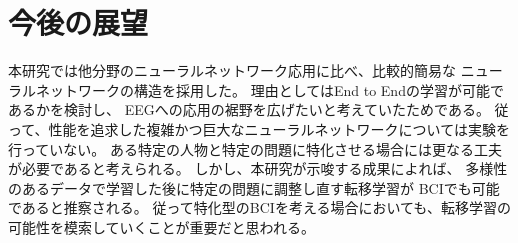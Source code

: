 \section{\mc 今後の展望}
本研究では他分野のニューラルネットワーク応用に比べ、比較的簡易な
ニューラルネットワークの構造を採用した。
理由としてはEnd to Endの学習が可能であるかを検討し、
EEGへの応用の裾野を広げたいと考えていたためである。
従って、性能を追求した複雑かつ巨大なニューラルネットワークについては実験を行っていない。
ある特定の人物と特定の問題に特化させる場合には更なる工夫が必要であると考えられる。
しかし、本研究が示唆する成果によれば、
多様性のあるデータで学習した後に特定の問題に調整し直す転移学習が
BCIでも可能であると推察される。
従って特化型のBCIを考える場合においても、転移学習の可能性を模索していくことが重要だと思われる。
